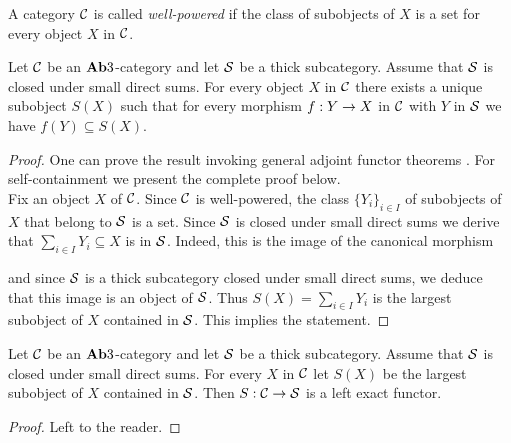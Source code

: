 \begin{definition}
A category ${\mathcal C}$ is called \textit{well-powered} if the class of subobjects of $X$ is a set for every object $X$ in ${\mathcal C}$.
\end{definition}

\begin{proposition}\label{proposition:largest_subobject_in_thick_subcategory}
Let ${\mathcal C}$ be an $\mathbf{Ab}3$-category and let ${\mathcal S}$ be a thick subcategory. Assume that ${\mathcal S}$ is closed under small direct sums. For every object $X$ in ${\mathcal C}$ there exists a unique subobject $S(X)$ such that for every morphism $f:Y\rightarrow X$ in ${\mathcal C}$ with $Y$ in ${\mathcal S}$ we have $f(Y)\subseteq S(X)$.
\end{proposition}
\begin{proof}
One can prove the result invoking general adjoint functor theorems {\cite[Chapter V, Sections 5 and 6]{Maclane}}. For self-containment we present the complete proof below.\\
Fix an object $X$ of ${\mathcal C}$. Since ${\mathcal C}$ is well-powered, the class $\{Y_i\}_{i\in I}$ of subobjects of $X$ that belong to ${\mathcal S}$ is a set. Since ${\mathcal S}$ is closed under small direct sums we derive that $\sum_{i\in I}Y_i\subseteq X$ is in ${\mathcal S}$. Indeed, this is the image of the canonical morphism
\begin{center}
\end{center}
and since ${\mathcal S}$ is a thick subcategory closed under small direct sums, we deduce that this image is an object of ${\mathcal S}$. Thus $S(X) = \sum_{i\in I}Y_i$ is the largest subobject of $X$ contained in ${\mathcal S}$. This implies the statement.
\end{proof}

\begin{fact}\label{fact:left_exactness_of_thicksubobject}
Let ${\mathcal C}$ be an $\mathbf{Ab}3$-category and let ${\mathcal S}$ be a thick subcategory. Assume that ${\mathcal S}$ is closed under small direct sums. For every $X$ in ${\mathcal C}$ let $S(X)$ be the largest subobject of $X$ contained in ${\mathcal S}$. Then $S:{\mathcal C}\rightarrow {\mathcal S}$ is a left exact functor.
\end{fact}
\begin{proof}
Left to the reader.
\end{proof}


